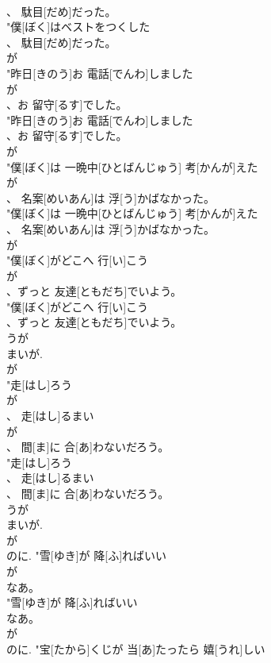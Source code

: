 \documentclass[8pt]{extreport}
\begin{document}
\begin{CJK}{UTF8}{min}
\\	、 駄目[だめ]だった。
\\	"僕[ぼく]はベストをつくした
\\	、 駄目[だめ]だった。
\\	が
\\	"昨日[きのう]お 電話[でんわ]しました
\\	が
\\	、お 留守[るす]でした。
\\	"昨日[きのう]お 電話[でんわ]しました
\\	、お 留守[るす]でした。
\\	が
\\	"僕[ぼく]は 一晩中[ひとばんじゅう] 考[かんが]えた
\\	が
\\	、 名案[めいあん]は 浮[う]かばなかった。
\\	"僕[ぼく]は 一晩中[ひとばんじゅう] 考[かんが]えた
\\	、 名案[めいあん]は 浮[う]かばなかった。
\\	が
\\	"僕[ぼく]がどこへ 行[い]こう
\\	が
\\	、ずっと 友達[ともだち]でいよう。
\\	"僕[ぼく]がどこへ 行[い]こう
\\	、ずっと 友達[ともだち]でいよう。
\\	うが
\\	まいが.
\\	が
\\	"走[はし]ろう
\\	が
\\	、 走[はし]るまい
\\	が
\\	、 間[ま]に 合[あ]わないだろう。
\\	"走[はし]ろう
\\	、 走[はし]るまい
\\	、 間[ま]に 合[あ]わないだろう。
\\	うが
\\	まいが.
\\	が
\\	のに.	"雪[ゆき]が 降[ふ]ればいい
\\	が
\\	なあ。
\\	"雪[ゆき]が 降[ふ]ればいい
\\	なあ。
\\	が
\\	のに.	"宝[たから]くじが 当[あ]たったら 嬉[うれ]しい

\end{CJK}
\end{document}
